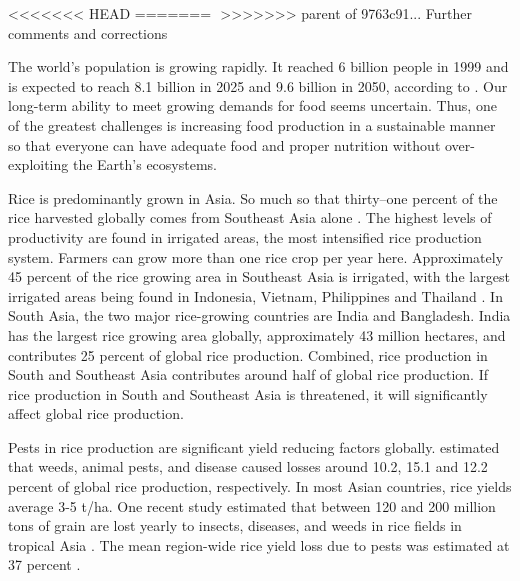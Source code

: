 <<<<<<< HEAD
=======
﻿%
>>>>>>> parent of 9763c91... Further comments and corrections


The world's population is growing rapidly. It reached 6 billion people in 1999 and is expected to reach 8.1 billion in 2025 and 9.6 billion in 2050, according to \citet{un2013world}. Our long-term ability to meet growing demands for food seems uncertain. Thus, one of the greatest challenges is increasing food production in a sustainable manner so that everyone can have adequate food and proper nutrition without over-exploiting the Earth's ecosystems. 

Rice is predominantly grown in Asia. So much so that thirty--one percent of the rice harvested globally comes from Southeast Asia alone \citep{oecd2012oecd}. The highest levels of productivity are found in irrigated areas, the most intensified rice production system. Farmers can grow more than one rice crop per year here. Approximately 45 percent of the rice growing area in Southeast Asia is irrigated, with the largest irrigated areas being found in Indonesia, Vietnam, Philippines and Thailand \citep{mutert2002developments}. In South Asia, the two major rice-growing countries are India and Bangladesh. India has the largest rice growing area globally, approximately 43 million hectares, and contributes 25 percent of global rice production. Combined, rice production in South and Southeast Asia contributes around half of global rice production. If rice production in South and Southeast Asia is threatened, it will significantly affect global rice production. 

Pests in rice production are significant yield reducing factors globally. \citet{OERKE:2006ct} estimated that weeds, animal pests, and disease caused losses around 10.2, 15.1 and 12.2 percent of global rice production, respectively. In most Asian countries, rice yields average 3-5 t/ha. One recent study estimated that between 120 and 200 million tons of grain are lost yearly to insects, diseases, and weeds in rice fields in tropical Asia \citep{willocquet2004research}. The mean region-wide rice yield loss due to pests was estimated at 37 percent \citep{Savary:2000vr}.

